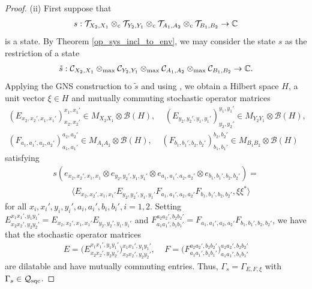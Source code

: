 \documentclass[11pt]{amsart}
\newcommand{\cl}[1]{\mathcal{#1}}
\newcommand{\bb}[1]{\mathbb{#1}}
\begin{document}
\begin{proof}
(ii) First suppose that
\begin{gather*}
	s: \cl{T}_{X_{2}, X_{1}}\otimes_{\rm c} \cl{T}_{Y_{2}, Y_{1}}\otimes_{\rm c} \cl{T}_{A_{1}, A_{2}}\otimes_{\rm c} \cl{T}_{B_{1}, B_{2}}\rightarrow \bb{C}
\end{gather*}
\noindent is a state. By Theorem \ref{op_sys_incl_to_env}, we may consider the state $s$ as the restriction of a state
\begin{gather*}
	\tilde{s}: \cl{C}_{X_{2}, X_{1}}\otimes_{\rm max} \cl{C}_{Y_{2}, Y_{1}}\otimes_{\rm max} \cl{C}_{A_{1}, A_{2}}\otimes_{\rm max} \cl{C}_{B_{1}, B_{2}}\rightarrow \bb{C}.
\end{gather*}
\noindent Applying the GNS construction to $\tilde{s}$ and using \cite[Theorem 5.2]{tt}, we obtain a Hilbert space $H$, a unit vector $\xi \in H$ and mutually commuting stochastic operator matrices
\begin{gather*}
	(E_{x_{2}, x_{2}', x_{1}, x_{1}'})_{x_{2}, x_{2}'}^{x_{1}, x_{1}'} \in M_{X_{2}X_{1}}\otimes \cl{B}(H), \;\;\;\; (E_{y_{2}, y_{2}', y_{1}, y_{1}'})_{y_{2}, y_{2}'}^{y_{1}, y_{1}'} \in M_{Y_{2}Y_{1}}\otimes \cl{B}(H), 
\\	(F_{a_{1}, a_{1}', a_{2}, a_{2}'})_{a_{1}, a_{1}'}^{a_{2}, a_{2}'} \in M_{A_{1}A_{2}}\otimes \cl{B}(H), \;\;\;\; (F_{b_{1}, b_{1}', b_{2}, b_{2}'})_{b_{1}, b_{1}'}^{b_{2}, b_{2}'} \in M_{B_{1}B_{2}}\otimes \cl{B}(H)
\end{gather*}
\noindent satisfying
\begin{gather*}
	s(e_{x_{2}, x_{2}', x_{1}, x_{1}}\otimes e_{y_{2}, y_{2}', y_{1}, y_{1}'}\otimes e_{a_{1}, a_{1}', a_{2}, a_{2}'}\otimes e_{b_{1}, b_{1}', b_{2}, b_{2}'}) = 
\\ \;\;\;\;\;\;\;\; \langle E_{x_{2}, x_{2}', x_{1}, x_{1}'}E_{y_{2}, y_{2}', y_{1}, y_{1}'}F_{a_{1}, a_{1}', a_{2}, a_{2}'}F_{b_{1}, b_{1}', b_{2}, b_{2}'}, \xi\xi^{*}\rangle
\end{gather*}
\noindent for all $x_{i}, x_{i}', y_{i}, y_{i}', a_{i}, a_{i}', b_{i}, b_{i}', i = 1, 2$. Setting $E_{x_{2}x_{2}', y_{2}y_{2}'}^{x_{1}x_{1}', y_{1}y_{1}'} = E_{x_{2}, x_{2}', x_{1}, x_{1}'}E_{y_{2}, y_{2}', y_{1}, y_{1}'}$ and $F_{a_{1}a_{1}', b_{1}b_{1}'}^{a_{2}a_{2}', b_{2}b_{2}'} = F_{a_{1}, a_{1}', a_{2}, a_{2}'}F_{b_{1}, b_{1}', b_{2}, b_{2}'}$, we have that the stochastic operator matrices 
\begin{gather*}
	E = \big(E_{x_{2}x_{2}', y_{2}y_{2}'}^{x_{1}x_{1}', y_{1}y_{1}'}\big)_{x_{2}x_{2}', y_{2}y_{2}'}^{x_{1}x_{1}', y_{1}y_{1}'}, \;\;\;\; F = \big(F_{a_{1}a_{1}', b_{1}b_{1}'}^{a_{2}a_{2}', b_{2}b_{2}'}\big)_{a_{1}a_{1}', b_{1}b_{1}'}^{a_{2}a_{2}', b_{2}b_{2}'}
\end{gather*}
\noindent are dilatable and have mutually commuting entries. Thus, $\Gamma_{s} = \Gamma_{E, F, \xi}$ with $\Gamma_{s} \in \cl{Q}_{\rm sqc}$. 


\end{proof}
\end{document}
